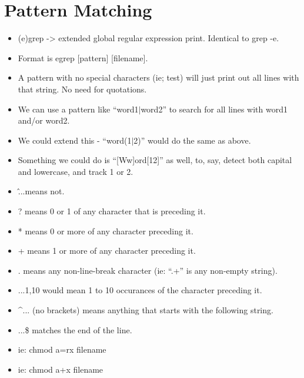 \documentclass{article}
\begin{document}
\section{Pattern Matching}
\begin{itemize}
		
\item (e)grep -> extended global regular expression print.  Identical to grep -e.
\item Format is egrep [pattern] [filename].
\item A pattern with no special characters (ie; test) will just print out all lines with that string.  No need for quotations.
\item We can use a pattern like ``word1$|$word2'' to search for all lines with word1 and/or word2.
\item We could extend this - “word(1$|$2)” would do the same as above.
\item Something we could do is “[Ww]ord[12]” as well, to, say, detect both capital and lowercase, and track 1 or 2.
\item \lbrack \^...\rbrack means not.
\item ? means 0 or 1 of any character that is preceding it.
\item * means 0 or more of any character preceding it.
\item + means 1 or more of any character preceding it.
\item . means any non-line-break character (ie: “.+” is any non-empty string).
\item ...{1,10} would mean 1 to 10 occurances of the character preceding it.
\item \^{}... (no brackets) means anything that starts with the following string.
\item ...\$ matches the end of the line.
\item ie: chmod a=rx filename
\item ie: chmod a+x filename

\end{itemize}
\end{document}
